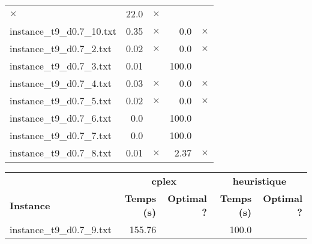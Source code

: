 \documentclass{article}
\begin{document}
\begin{center}
\begin{tabular}{lrrrr}
$\times$
 & 22.0 & 
$\times$
\\
instance\_t9\_d0.7\_10.txt & 0.35 & 
$\times$
 & 0.0 & 
$\times$
\\
instance\_t9\_d0.7\_2.txt & 0.02 & 
$\times$
 & 0.0 & 
$\times$
\\
instance\_t9\_d0.7\_3.txt & 0.01 & 
 & 100.0 & 
\\
instance\_t9\_d0.7\_4.txt & 0.03 & 
$\times$
 & 0.0 & 
$\times$
\\
instance\_t9\_d0.7\_5.txt & 0.02 & 
$\times$
 & 0.0 & 
$\times$
\\
instance\_t9\_d0.7\_6.txt & 0.0 & 
 & 100.0 & 
\\
instance\_t9\_d0.7\_7.txt & 0.0 & 
 & 100.0 & 
\\
instance\_t9\_d0.7\_8.txt & 0.01 & 
$\times$
 & 2.37 & 
$\times$
\\
\hline\end{tabular}
\end{center}

\newpage
\begin{center}
\renewcommand{\arraystretch}{1.4}
 \begin{tabular}{lrrrr}
	\hline
 & \multicolumn{2}{c}{\textbf{cplex}} & \multicolumn{2}{c}{\textbf{heuristique}}\\
\textbf{Instance}  & \textbf{Temps (s)} & \textbf{Optimal ?}  & \textbf{Temps (s)} & \textbf{Optimal ?} \\\hline

instance\_t9\_d0.7\_9.txt & 155.76 & 
 & 100.0 & 
\\
\hline\end{tabular}
\end{center}
\end{document}
